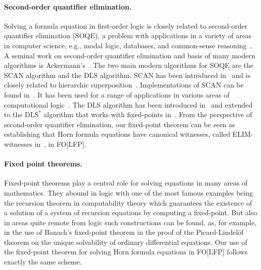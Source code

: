 \documentclass[acmsmall]{acmart}
\theoremstyle{plain}
\theoremstyle{definition}
\begin{document}


\paragraph{Second-order quantifier elimination.}
%
Solving a formula equation in first-order logic is closely related to second-order
 quantifier elimination (SOQE), a problem with applications in a variety of areas in
 computer science, e.g., modal logic, databases, and common-sense
 reasoning~\cite{Gabbay08Second}.
A seminal work on second-order quantifier elimination and basis of many modern algorithms
 is Ackermann's~\cite{Ackermann35Untersuchungen}.
The two main modern algorithms for SOQE are the SCAN algorithm and the DLS algorithm.
SCAN has been introduced in~\cite{Gabbay92Quantifier} and is closely related to
 hierarchic superposition~\cite{Bachmair94Refutational}.
Implementations of SCAN can be found in~\cite{Engel96Quantifier,Ohlbach96SCAN}.
It has been used for a range of applications in various areas of
 computational logic~\cite{Goranko03Scan,Gabbay08Second}.
The DLS algorithm has been introduced in~\cite{Doherty97Computing} and extended to
 the $\text{DLS}^*$ algorithm that works with fixed-points
 in~\cite{Doherty98General,Nonnengart98Fixpoint}.
From the perspective of second-order quantifier elimination, our fixed-point theorem can
 be seen as establishing that Horn formula equations have canonical witnesses, called
 ELIM-witnesses in~\cite{Wernhard17Boolean}, in FO[LFP].

\paragraph{Fixed point theorems.}
%
Fixed-point theorems play a central role for solving equations in many areas of mathematics.
They abound in logic with one of the most famous examples being the recursion theorem in computability
theory which guarantees the existence of a solution of a system of recursion equations by computing a fixed-point.
But also in areas quite remote from logic such constructions can be found, as, for example, in
the use of Banach's fixed-point theorem in the proof of the
Picard-Lindelöf theorem on the unique solvability of ordinary differential equations.
Our use of the fixed-point theorem for solving Horn formula equations in FO[LFP]
 follows exactly the same scheme.
\end{document}
